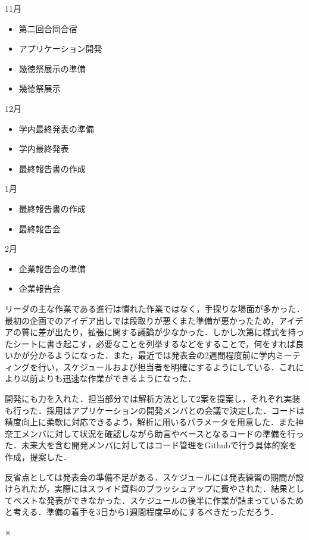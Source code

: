 11月
\begin{itemize}
\item 第二回合同合宿
\item アプリケーション開発
\item 幾徳祭展示の準備
\item 幾徳祭展示
\end{itemize}
12月
\begin{itemize}
\item 学内最終発表の準備
\item 学内最終発表
\item 最終報告書の作成
\end{itemize}
1月
\begin{itemize}
\item 最終報告書の作成
\item 最終報告会
\end{itemize}
2月
\begin{itemize}
\item 企業報告会の準備
\item 企業報告会
\end{itemize}

\par リーダの主な作業である進行は慣れた作業ではなく，手探りな場面が多かった．最初の企画でのアイデア出しでは段取りが悪くまた準備が悪かったため，アイデアの質に差が出たり，拡張に関する議論が少なかった．しかし次第に様式を持ったシートに書き起こす，必要なことを列挙するなどをすることで，何をすれば良いかが分かるようになった．また，最近では発表会の2週間程度前に学内ミーティングを行い，スケジュールおよび担当者を明確にするようにしている．これにより以前よりも迅速な作業ができるようになった．
\par 開発にも力を入れた．担当部分では解析方法として2案を提案し，それぞれ実装も行った．採用はアプリケーションの開発メンバとの会議で決定した．コードは精度向上に柔軟に対応できるよう，解析に用いるパラメータを用意した．また神奈工メンバに対して状況を確認しながら助言やベースとなるコードの準備を行った．未来大を含む開発メンバに対してはコード管理をGithubで行う具体的案を作成，提案した．
\par 反省点としては発表会の準備不足がある．スケジュールには発表練習の期間が設けられたが，実際にはスライド資料のブラッシュアップに費やされた．結果としてベストな発表ができなかった．スケジュールの後半に作業が詰まっているためと考える．準備の着手を3日から1週間程度早めにするべきだっただろう．

※
